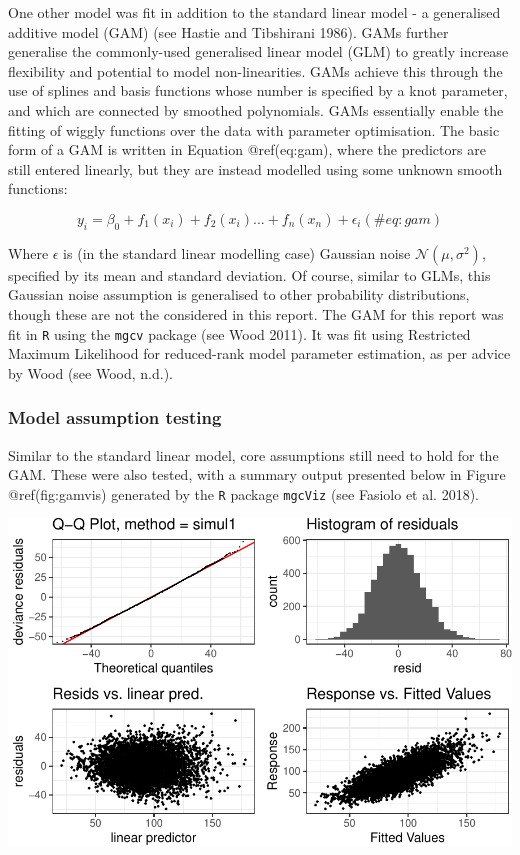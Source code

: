 \documentclass{article}
\begin{document}
One other model was fit in addition to the standard linear model - a
generalised additive model (GAM) (see Hastie and Tibshirani 1986). GAMs
further generalise the commonly-used generalised linear model (GLM) to
greatly increase flexibility and potential to model non-linearities.
GAMs achieve this through the use of splines and basis functions whose
number is specified by a knot parameter, and which are connected by
smoothed polynomials. GAMs essentially enable the fitting of wiggly
functions over the data with parameter optimisation. The basic form of a
GAM is written in Equation @ref(eq:gam), where the predictors are still
entered linearly, but they are instead modelled using some unknown
smooth functions:

\begin{equation}
y_i = \beta_0 + f_1(x_i) + f_2(x_i)... + f_n(x_n) + \epsilon_i (\#eq:gam)
\end{equation}

Where \(\epsilon\) is (in the standard linear modelling case) Gaussian
noise \(\mathcal{N}(\mu,\sigma^2)\), specified by its mean and standard
deviation. Of course, similar to GLMs, this Gaussian noise assumption is
generalised to other probability distributions, though these are not the
considered in this report. The GAM for this report was fit in \texttt{R}
using the \texttt{mgcv} package (see Wood 2011). It was fit using
Restricted Maximum Likelihood for reduced-rank model parameter
estimation, as per advice by Wood (see Wood, n.d.).

\hypertarget{model-assumption-testing-1}{%
\subsubsection{Model assumption
testing}\label{model-assumption-testing-1}}

Similar to the standard linear model, core assumptions still need to
hold for the GAM. These were also tested, with a summary output
presented below in Figure @ref(fig:gamvis) generated by the \texttt{R}
package \texttt{mgcViz} (see Fasiolo et al. 2018).

\includegraphics{OLET5608_TrentHenderson_files/figure-latex/gamvis-1.pdf}
\end{document}
